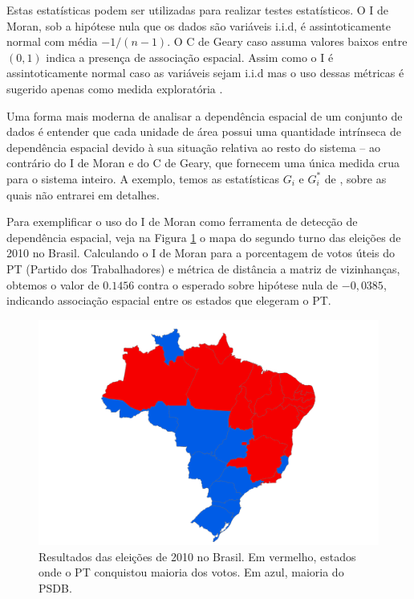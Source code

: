 Estas estatísticas podem ser utilizadas para realizar testes estatísticos.
O I de Moran, sob a hipótese nula que os dados são variáveis i.i.d, é assintoticamente normal com média $-1/(n-1)$.
O C de Geary caso assuma valores baixos entre $(0,1)$ indica a presença de associação espacial.
Assim como o I é assintoticamente normal caso as variáveis sejam i.i.d mas o uso dessas métricas é sugerido apenas como medida exploratória \cite{Li2007}.

Uma forma mais moderna de analisar a dependência espacial de um conjunto de dados é entender que cada unidade de área possui uma quantidade intrínseca de dependência espacial devido à sua situação relativa ao resto do sistema -- ao contrário do I de Moran e do C de Geary, que fornecem uma única medida crua para o sistema inteiro.
A exemplo, temos as estatísticas $G_i$ e $G_i^*$ de \cite{GetisOrd1992}, sobre as quais não entrarei em detalhes.


Para exemplificar o uso do I de Moran como ferramenta de detecção de dependência espacial, veja na Figura \ref{fig:pt} o mapa do segundo turno das eleições de 2010 no Brasil.
Calculando o I de Moran para a porcentagem de votos úteis do PT (Partido dos Trabalhadores) e métrica de distância a matriz de vizinhanças, obtemos o valor de $0.1456$ contra o esperado sobre hipótese nula de $-0,0385$, indicando associação espacial entre os estados que elegeram o PT.

\begin{figure}
    \centering
    \includegraphics[width = 0.8\linewidth]{images/eleicoes_2010.png}
    \caption{Resultados das eleições de 2010 no Brasil. Em vermelho, estados onde o PT conquistou maioria dos votos. Em azul, maioria do PSDB.}
    \label{fig:pt}
\end{figure}

